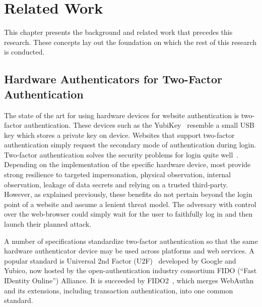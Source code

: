 \chapter{Related Work}\label{Chap:RelatedWork}

This chapter presents the background and related work that precedes this research. These concepts lay out the foundation on which the rest of this research is conducted.

\section{Hardware Authenticators for \newline Two-Factor Authentication}\label{Sec:HardwareAuthenticators_2FA}

The state of the art for using hardware devices for website authentication is two-factor authentication. These devices such as the YubiKey~\cite{yubico-products} resemble a small USB key which stores a private key on device. Websites that support two-factor authentication simply request the secondary mode of authentication during login. Two-factor authentication solves the security problems for login quite well~\cite{questRemovePasswords}. Depending on the implementation of the specific hardware device, most provide strong resilience to targeted impersonation, physical observation, internal observation, leakage of data secrets and relying on a trusted third-party. However, as explained previously, these benefits do not pertain beyond the login point of a website and assume a lenient threat model. The adversary with control over the web-browser could simply wait for the user to faithfully log in and then launch their planned attack. 


A number of specifications standardize two-factor authentication so that the same hardware authenticator device may be used across platforms and web services. A popular standard is Universal 2nd Factor (U2F)~\cite{fido-u2f} developed by Google and Yubico, now hosted by the open-authentication industry consortium FIDO (``Fast IDentity Online'') Alliance. It is succeeded by FIDO2~\cite{fido2}, which merges WebAuthn and its extensions, including transaction authentication, into one common standard.

